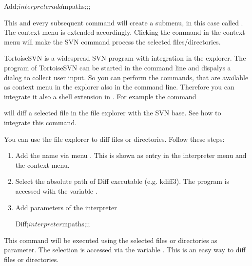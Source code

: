 \begin{code}
 Add;$interpreter add $mpaths;;;
\end{code}

This and every subsequent command will create a submenu, in this case called . The context menu is extended accordingly. Clicking the command in the context menu will make the SVN command  process the selected files/directories.

TortoiseSVN is a widespread SVN program with integration in the explorer. The program  of TortoiseSVN can be started in the command line and dispalys a dialog to collect user input. So you can perform the commands, that are available as context menu in the explorer also in the command line. Therefore you can integrate it also a shell extension in \codeblocks. For example the command


will diff a selected file in the \codeblocks file explorer with the SVN base. See  how to integrate this command.



You can use the file explorer to diff files or directories. Follow these steps:

\begin{enumerate}
\item Add the name via menu . This is shown as entry in the interpreter menu and the context menu.
\item Select the absolute path of Diff executable (e.g. kdiff3). The program is accessed with the variable .
\item Add parameters of the interpreter
\begin{cmd}
Diff;$interpreter $mpaths;;;
\end{cmd}
\end{enumerate}

This command will be executed using the selected files or directories as parameter. The selection is accessed via the variable . This is an easy way to diff files or directories.

